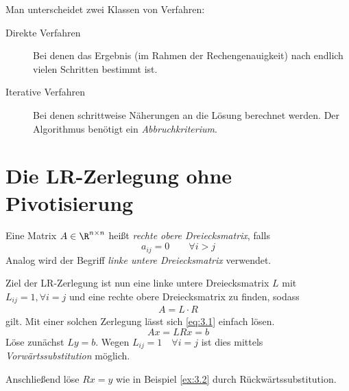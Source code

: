\documentclass{mycourse}
\begin{document}
Man unterscheidet zwei Klassen von Verfahren:
\begin{description}
\item[Direkte Verfahren]
Bei denen das Ergebnis (im Rahmen der Rechengenauigkeit) nach endlich vielen Schritten bestimmt ist.
\item[Iterative Verfahren]
Bei denen schrittweise Näherungen an die Lösung berechnet werden. 
Der Algorithmus benötigt ein \emph{Abbruchkriterium}.
\end{description}


\section{Die LR-Zerlegung ohne Pivotisierung}

\begin{df}
\label{df:3.3}
Eine Matrix $A\in \R^{n\times n}$ heißt \emph{rechte obere Dreiecksmatrix}, falls 
\[
a_{ij}=0 \qquad \forall i>j
\]
Analog wird der Begriff \emph{linke untere Dreiecksmatrix} verwendet.
\end{df}

Ziel der LR-Zerlegung ist nun eine linke untere Dreiecksmatrix $L$ mit $L_{ij}=1, \forall i=j$ und eine rechte obere Dreiecksmatrix zu finden, sodass
\begin{align}
\label{eq:3.3}
A=L\cdot R
\end{align}
gilt.
Mit einer solchen Zerlegung lässt sich \eqref{eq:3.1} einfach lösen.
\[
Ax= LR x=b
\]
Löse zunächst $Ly=b$.
Wegen $L_{ij}=1 \quad \forall i=j$ ist dies mittels \emph{Vorwärtssubstitution} möglich.

Anschließend löse $Rx=y$ wie in Beispiel \ref{ex:3.2} durch Rückwärtssubstitution.
\end{document}
